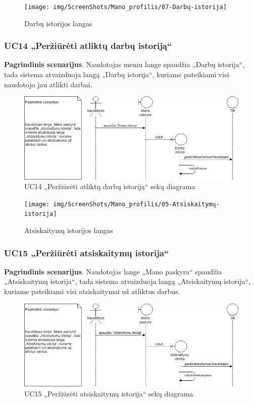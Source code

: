 \documentclass{VUMIFPSbakalaurinis}
\begin{document}
\begin{figure}[H]
	\centering
	\texttt{[image: img/ScreenShots/Mano\_profilis/07-Darbų-istorija]}
	\caption{Darbų istorijos langas}
	\label{img:work history}
\end{figure}

\subsubsection{UC14 „Peržiūrėti atliktų darbų istoriją“}
\textbf{Pagrindinis scenarijus}. Naudotojas meniu lange spaudžia „Darbų istorija“, tada sistema atvaizduoja langą „Darbų istorija“, kuriame pateikiami visi naudotojo jau atlikti darbai.

\begin{figure}[H]
	\centering
	\includegraphics[scale=0.6]{img/Sequence/SD14}
	\caption{UC14 „Peržiūrėti atliktų darbų istoriją“ sekų diagrama}
	\label{img:uc14seq}
\end{figure}

\begin{figure}[H]
	\centering
	\texttt{[image: img/ScreenShots/Mano\_profilis/05-Atsiskaitymų-istorija]}
	\caption{Atsiskaitymų istorijos langas}
	\label{img:payment history}
\end{figure}
\subsubsection{UC15 „Peržiūrėti atsiskaitymų istorija“}
\textbf{Pagrindinis scenarijus}. Naudotojas lange „Mano paskyra“ spaudžia „Atsiskaitymų istorija“, tada sistema atvaizduoja langą „Atsiskaitymų istorija“, kuriame pateikiami visi atsiskaitymai už atliktus darbus.

\begin{figure}[H]
	\centering
	\includegraphics[scale=0.6]{img/Sequence/SD15}
	\caption{UC15 „Peržiūrėti atsiskaitymų istorija“ sekų diagrama}
	\label{img:uc15seq}
\end{figure}
\end{document}
